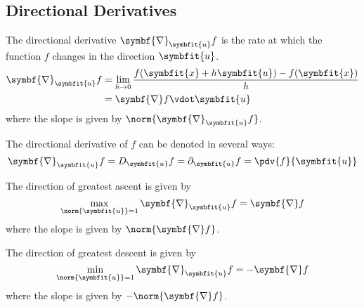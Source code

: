 \documentclass{article}
\begin{document}
\subsection{Directional Derivatives}
\begin{definition}
    The directional derivative $\symbf{\nabla}_{\symbfit{u}}f$ is the rate at
    which the function $f$ changes in the direction $\symbfit{u}$.
    \begin{align*}
        \symbf{\nabla}_{\symbfit{u}}f &= \lim_{h \to 0} \frac{f(\symbfit{x} + h\symbfit{u}) - f(\symbfit{x})}{h} \\
        &= \symbf{\nabla}f \vdot \symbfit{u}
    \end{align*}
    where the slope is given by $\norm{\symbf{\nabla}_{\symbfit{u}}f}$.
\end{definition}
\begin{remark}
    The directional derivative of $f$ can be denoted in several ways:
    \begin{equation*}
        \symbf{\nabla}_{\symbfit{u}}f = D_{\symbfit{u}} f = \partial_{\symbfit{u}} f = \pdv{f}{\symbfit{u}}
    \end{equation*}
\end{remark}
\begin{theorem}
    The direction of greatest ascent is given by
    \begin{equation*}
        \max_{\norm{\symbfit{u}} = 1} \symbf{\nabla}_{\symbfit{u}}f = \symbf{\nabla}f
    \end{equation*}
    where the slope is given by $\norm{\symbf{\nabla}f}$.
\end{theorem}
\begin{theorem}
    The direction of greatest descent is given by
    \begin{equation*}
        \min_{\norm{\symbfit{u}} = 1} \symbf{\nabla}_{\symbfit{u}}f = -\symbf{\nabla}f
    \end{equation*}
    where the slope is given by $-\norm{\symbf{\nabla}f}$.
\end{theorem}
\end{document}
